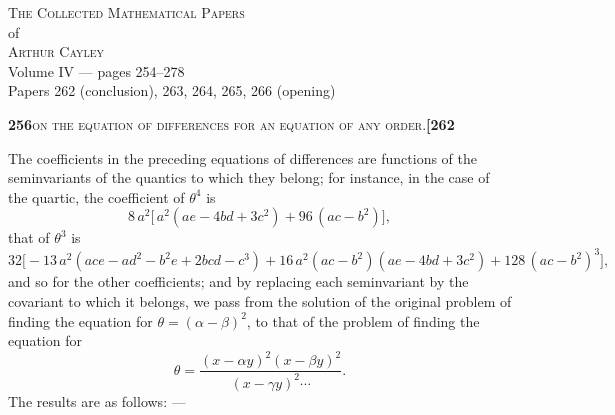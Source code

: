 \documentclass[11pt]{article}
\begin{document}
\thispagestyle{empty}
\begin{center}
\vspace*{2cm}
{\Large\scshape The Collected Mathematical Papers}\\[0.4em]
{\large of}\\[0.4em]
{\Large\scshape Arthur Cayley}\\[1.5em]
{\large Volume IV --- pages 254--278}\\[0.6em]
{\normalsize Papers 262 (conclusion), 263, 264, 265, 266 (opening)}\\[2em]
\vfill
\end{center}
\newpage

\setcounter{page}{254}




\newpage
\setcounter{page}{256}

\noindent\textbf{256}\hfill\textsc{on the equation of differences for an equation of any order.}\hfill\textbf{[262}

\medskip


\medskip

\noindent The coefficients in the preceding equations of differences are functions of the seminvariants of the quantics to which they belong; for instance, in the case of the quartic, the coefficient of $\theta^4$ is
\[
  8\,a^2\bigl[\,a^2(ae - 4bd + 3c^2) + 96\,(ac - b^2)\bigr],
\]
that of $\theta^3$ is
\[
  32\bigl[-13\,a^2(ace - ad^2 - b^2 e + 2bcd - c^3) + 16\,a^2(ac - b^2)(ae - 4bd + 3c^2) + 128\,(ac - b^2)^3\bigr],
\]
and so for the other coefficients; and by replacing each seminvariant by the covariant to which it belongs, we pass from the solution of the original problem of finding the equation for $\theta = (\alpha - \beta)^2$, to that of the problem of finding the equation for
\[
  \theta = \frac{(x - \alpha y)^2 (x - \beta y)^2}{(x - \gamma y)^2 \cdots}.
\]
The results are as follows: ---
\end{document}
